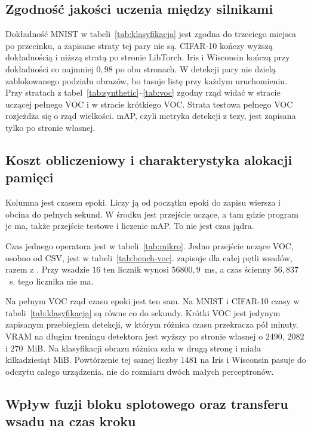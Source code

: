 \subsection{Zgodność jakości uczenia między silnikami}

Dokładność MNIST w tabeli~\ref{tab:klasyfikacja} jest zgodna do trzeciego miejsca po przecinku, a zapisane straty tej pary nie są. CIFAR-10 kończy wyższą dokładnością i niższą stratą po stronie LibTorch. Iris i Wisconsin kończą przy dokładności co najmniej \(0{,}98\) po obu stronach. W detekcji pary nie dzielą zablokowanego podziału obrazów, bo  tasuje listę przy każdym uruchomieniu. Przy stratach z tabel~\ref{tab:synthetic}--\ref{tab:voc} zgodny rząd widać w stracie uczącej pełnego VOC i w stracie krótkiego VOC. Strata testowa pełnego VOC rozjeżdża się o rząd wielkości. mAP, czyli metryka detekcji z tezy, jest zapisana tylko po stronie własnej.

\subsection{Koszt obliczeniowy i charakterystyka alokacji pamięci}

Kolumna  jest czasem epoki. Liczy ją  od początku epoki do zapisu wiersza i obcina do pełnych sekund. W środku jest przejście uczące, a tam gdzie program je ma, także przejście testowe i liczenie mAP. To nie jest czas jądra.

Czas jednego operatora jest w tabeli~\ref{tab:mikro}. Jedno przejście uczące VOC, osobno od CSV, jest w tabeli~\ref{tab:bench-voc}.  zapisuje  dla całej pętli wsadów, razem z . Przy wsadzie \(16\) ten licznik wynosi \(56800{,}9\)~ms, a czas ścienny \(56{,}837\)~s.  tego licznika nie ma.

Na pełnym VOC rząd czasu epoki jest ten sam. Na MNIST i CIFAR-10 czasy w tabeli~\ref{tab:klasyfikacja} są równe co do sekundy. Krótki VOC jest jedynym zapisanym przebiegiem detekcji, w którym różnica czasu przekracza pół minuty. VRAM na długim treningu detektora jest wyższy po stronie własnej o \(2490\), \(2082\) i \(270\)~MiB. Na klasyfikacji obrazu różnica szła w drugą stronę i miała kilkadziesiąt MiB. Powtórzenie tej samej liczby \(1481\) na Iris i Wisconsin pasuje do odczytu całego urządzenia, nie do rozmiaru dwóch małych perceptronów.

\subsection{Wpływ fuzji bloku splotowego oraz transferu wsadu na czas kroku}

